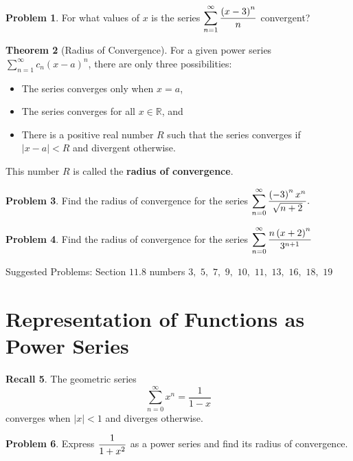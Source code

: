 \documentclass[letterpaper, twoside, 12pt]{book}
\theoremstyle{definition}
\newtheorem{theorem}{Theorem}
\newtheorem{recall}[theorem]{Recall}
\theoremstyle{definition}
\newtheorem{problem}[theorem]{Problem}
\newcommand{\ds}{\ensuremath{\displaystyle}}
\begin{document}
\vfill

\begin{problem}
 For what values of $x$ is the series $\ds \sum_{n=1}^{\infty} \frac{\left(x-3\right)^n}{n}$ convergent?
\end{problem}

\vfill

\newpage

\begin{theorem}[Radius of Convergence]
 For a given power series $\sum_{n=1}^{\infty} c_n\left(x-a\right)^n$, there are only three possibilities:
 \begin{itemize}
  \item The series converges only when $x=a$,
  \item The series converges for all $x \in \mathbb{R}$, and
  \item There is a positive real number $R$ such that the series converges if $\left|x-a\right| < R$ and divergent otherwise.
 \end{itemize}
 This number $R$ is called the \textbf{radius of convergence}.
\end{theorem}

\begin{problem}
 Find the radius of convergence for the series $\ds \sum_{n=0}^{\infty} \frac{\left(-3\right)^n x^n}{\sqrt{n+2}}.$
\end{problem}

\vfill

\begin{problem}
 Find the radius of convergence for the series $\ds \sum_{n=0}^{\infty} \frac{n\left(x+2\right)^n}{3^{n+1}}$
\end{problem}

\vfill

\noindent Suggested Problems: Section $11.8$ numbers $3,$ $5,$ $7,$ $9,$ $10,$ $11,$ $13,$ $16,$ $18,$ $19$

\newpage

\section{Representation of Functions as Power Series}

\begin{recall}
 The geometric series $$\sum_{n=0}^{\infty} x^n = \frac{1}{1-x}$$
 converges when $\left|x\right| < 1$ and diverges otherwise.
\end{recall}

\begin{problem}
 Express $\ds \frac{1}{1+x^2}$ as a power series and find its
 radius of convergence.
\end{problem}
\end{document}
